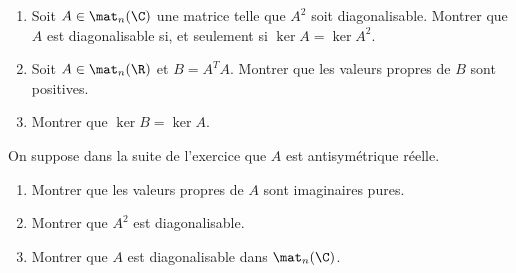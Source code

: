 \begin{enonce}
\begin{exercise}[ID={RMS126 E492},subtitle={Mines-Ponts PSI 2015},tags={}]
\begin{enumerate}
  \item Soit $A\in\mat_n(\C)$ une matrice telle que $A^2$ soit diagonalisable.
    Montrer que $A$ est diagonalisable si, et seulement si $\ker A=\ker A^2$.

  \item Soit $A\in\mat_n(\R)$ et $B=A^T A$.
    Montrer que les valeurs propres de $B$ sont positives.

  \item Montrer que $\ker B=\ker A$.
\end{enumerate}
On suppose dans la suite de l'exercice que $A$ est antisymétrique réelle.
\begin{enumerate}[resume]
  \item Montrer que les valeurs propres de $A$ sont imaginaires pures.

  \item Montrer que $A^2$ est diagonalisable.

  \item Montrer que $A$ est diagonalisable dans $\mat_n(\C)$.
\end{enumerate}
\end{exercise}
\begin{solution}
\end{solution}
\end{enonce}
